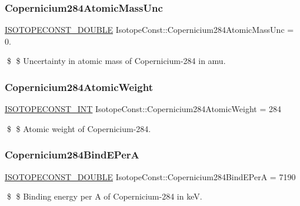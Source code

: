 \subsubsection{\texorpdfstring{Copernicium284\+Atomic\+Mass\+Unc}{Copernicium284AtomicMassUnc}}
{\footnotesize\ttfamily \mbox{\hyperlink{group___isotope_const-_macros_ga8f45a7272ce02c0b4c65c44636ed719a}{I\+S\+O\+T\+O\+P\+E\+C\+O\+N\+S\+T\+\_\+\+D\+O\+U\+B\+LE}} Isotope\+Const\+::\+Copernicium284\+Atomic\+Mass\+Unc = 0.}

\$ \$ Uncertainty in atomic mass of Copernicium-\/284 in amu. \mbox{\label{group___isotope_const-_copernicium-_cn284_gaed5b02f13df98fafb8b1926370813feb}} 
\subsubsection{\texorpdfstring{Copernicium284\+Atomic\+Weight}{Copernicium284AtomicWeight}}
{\footnotesize\ttfamily \mbox{\hyperlink{group___isotope_const-_macros_ga5f18360b3e99483a35c32d789e62621c}{I\+S\+O\+T\+O\+P\+E\+C\+O\+N\+S\+T\+\_\+\+I\+NT}} Isotope\+Const\+::\+Copernicium284\+Atomic\+Weight = 284}

\$ \$ Atomic weight of Copernicium-\/284. \mbox{\label{group___isotope_const-_copernicium-_cn284_ga14eb2a592983fa30296ad23a45a4f122}} 
\subsubsection{\texorpdfstring{Copernicium284\+Bind\+E\+PerA}{Copernicium284BindEPerA}}
{\footnotesize\ttfamily \mbox{\hyperlink{group___isotope_const-_macros_ga8f45a7272ce02c0b4c65c44636ed719a}{I\+S\+O\+T\+O\+P\+E\+C\+O\+N\+S\+T\+\_\+\+D\+O\+U\+B\+LE}} Isotope\+Const\+::\+Copernicium284\+Bind\+E\+PerA = 7190}

\$ \$ Binding energy per A of Copernicium-\/284 in keV. \mbox{\label{group___isotope_const-_copernicium-_cn284_gafdde45a5be1605f9f80920113d0ec94c}} 
